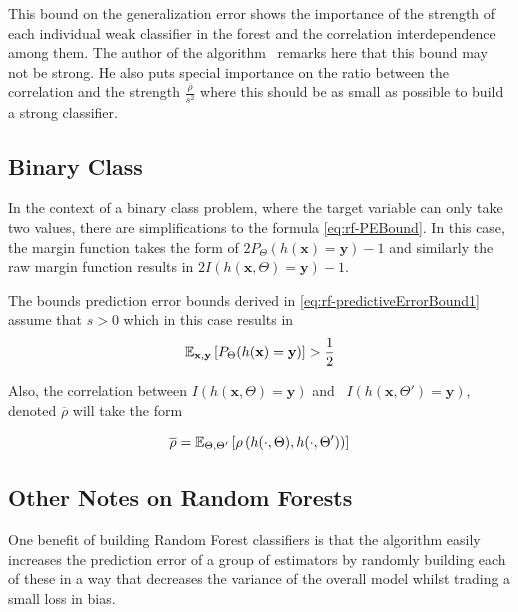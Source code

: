 This bound on the generalization error shows the importance of the strength of each individual weak classifier in the forest and the correlation interdependence among them.
The author of the algorithm~\cite{breiman-randomforests} remarks here that this bound may not be strong.
He also puts special importance on the ratio between the correlation and the strength $\frac{\overline{\rho}}{s^2}$ where this should be as small as possible to build a strong classifier.


\subsection{Binary Class}\label{subsection:random_forests_binary_class}

In the context of a binary class problem, where the target variable can only take two values, there are simplifications to the formula \cref{eq:rf-PEBound}.
In this case, the margin function takes the form of $2 P_{\Theta}(h(\textbf{x}) = \textbf{y}) -1$ and similarly the raw margin function results in $2 I(h(\textbf{x}, \Theta) = \textbf{y}) -1$.


The bounds prediction error bounds derived in \cref{eq:rf-predictiveErrorBound1} assume that $s >0$ which in this case results in
\begin{equation}
\operatorname{\mathbb{E}}_{\textbf{x},\textbf{y}} \left[ P_{\Theta}(h(\textbf{x}) = \textbf{y}) \right] > \frac{1}{2}
\end{equation}


Also, the correlation between $I(h(\textbf{x}, \Theta) = \textbf{y})$ and \ $I(h(\textbf{x}, \Theta') = \textbf{y})$, denoted $\overline{\rho}$ will take the form

\begin{equation}
 \overline{\rho} = \operatorname{\mathbb{E}}_{\Theta,\Theta'} \left[ \rho \left( h(\cdot{},\Theta) ,h(\cdot{},\Theta') \right)  \right]
 \end{equation}



%


\subsection{Other Notes on Random Forests}\label{subsection:random_forests_other_notes}

One benefit of building Random Forest classifiers is that the algorithm easily increases the prediction error of a group of estimators by randomly building each of these in a way that decreases the variance of the overall model whilst trading a small loss in bias.

